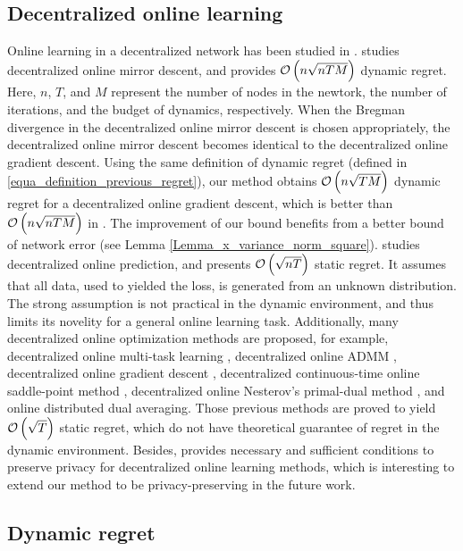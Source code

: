 \documentclass{article}
\begin{document}
\subsection{Decentralized online learning}
Online learning in a decentralized network has been studied in \citep{8015179Shahram,Kamp:2014:CDO,Koppel-8352032,Zhang2018,pmlr-v70-zhang17g,Xu2015,tcns-7353155,cdc-7798923,acc-7172037,tcns-7479495,Benczur:2018ww,tkde-6311406}.  \citet{8015179Shahram} studies decentralized online mirror descent, and provides ${\mathcal{O}\left( n\sqrt{nTM} \right)}$ dynamic regret. Here, $n$, $T$, and $M$ represent the number of nodes in the newtork, the number of iterations, and the budget of dynamics, respectively.  When the Bregman divergence in the decentralized online mirror descent is chosen appropriately, the decentralized online mirror descent becomes identical to the decentralized online gradient descent. Using the same definition of dynamic regret (defined in \eqref{equa_definition_previous_regret}), our method obtains ${\mathcal{O}\left( n\sqrt{TM} \right)}$ dynamic regret for a decentralized online gradient descent, which is better than ${\mathcal{O}\left( n\sqrt{nTM} \right)}$ in \citet{8015179Shahram}. The improvement of our bound benefits from a better bound of network error (see Lemma \ref{Lemma_x_variance_norm_square}). \citet{Kamp:2014:CDO} studies decentralized online prediction, and presents ${\mathcal{O}\left( \sqrt{nT} \right)}$ static regret.  It assumes that all data, used to yielded the loss, is generated from an unknown distribution. The strong assumption is not practical in the dynamic environment, and thus limits its novelity for a general online learning task. 
Additionally, many decentralized online optimization methods are proposed, for example, decentralized online multi-task learning \citep{Zhang2018}, decentralized online ADMM \citep{Xu2015}, decentralized online gradient descent \citep{tcns-7353155}, decentralized continuous-time online saddle-point method \citep{cdc-7798923}, decentralized online  Nesterov's primal-dual method \citep{acc-7172037,tcns-7479495}, and online distributed dual averaging\citep{6760092}. Those previous methods are proved to yield ${\mathcal{O}\left( \sqrt{T} \right)}$ static regret, which do not have theoretical guarantee of regret in the dynamic environment.   Besides,  \citet{tkde-6311406} provides necessary and sufficient conditions to preserve privacy for decentralized online learning methods, which  is interesting to extend our method to be privacy-preserving in the future work.


\subsection{Dynamic regret}
\end{document}
